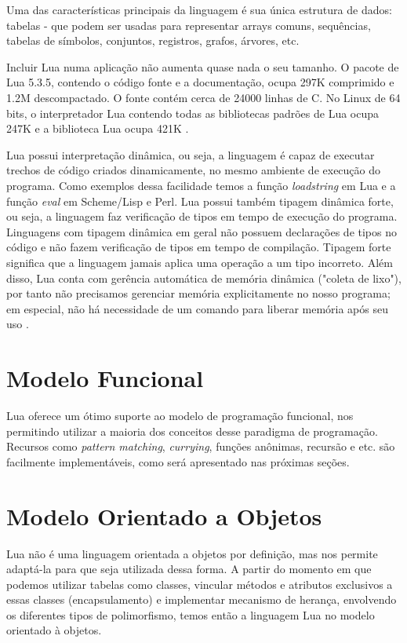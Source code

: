 \documentclass[rel_mlp]{iiufrgs}
\begin{document}
Uma das características principais da linguagem é sua única estrutura de dados: tabelas - que podem ser usadas para representar arrays comuns, sequências, tabelas de símbolos, conjuntos, registros, grafos, árvores, etc.

Incluir Lua numa aplicação não aumenta quase nada o seu tamanho. O pacote de Lua 5.3.5, contendo o código fonte e a documentação, ocupa 297K comprimido e 1.2M descompactado. O fonte contém cerca de 24000 linhas de C. No Linux de 64 bits, o interpretador Lua contendo todas as bibliotecas padrões de Lua ocupa 247K e a biblioteca Lua ocupa 421K \cite{AboutLua}.

Lua possui interpretação dinâmica, ou seja, a linguagem é capaz de executar trechos de código criados dinamicamente, no mesmo ambiente de execução do programa. Como exemplos dessa facilidade temos a função \textit{loadstring} em Lua e a função \textit{eval} em Scheme/Lisp e Perl. Lua possui também tipagem dinâmica forte, ou seja, a linguagem faz verificação de tipos em tempo de execução do programa. Linguagens com
tipagem dinâmica em geral não possuem declarações de tipos no código e não fazem verificação de tipos em tempo de compilação. Tipagem forte significa que a linguagem jamais aplica uma operação a um tipo incorreto. Além disso, Lua conta com gerência automática de memória dinâmica ("coleta de lixo"), por tanto não precisamos gerenciar memória explicitamente no nosso programa; em especial, não há necessidade de um comando para liberar memória após seu uso \cite{IntroLuaPDF}.

\section{Modelo Funcional}

Lua oferece um ótimo suporte ao modelo de programação funcional, nos permitindo utilizar a maioria dos conceitos desse paradigma de programação. Recursos como \textit{pattern matching}, \textit{currying}, funções anônimas, recursão e etc. são facilmente implementáveis, como será apresentado nas próximas seções.

\section{Modelo Orientado a Objetos}

Lua não é uma linguagem orientada a objetos por definição, mas nos permite adaptá-la para que seja utilizada dessa forma. A partir do momento em que podemos utilizar tabelas como classes, vincular métodos e atributos exclusivos a essas classes (encapsulamento) e implementar mecanismo de herança, envolvendo os diferentes tipos de polimorfismo, temos então a linguagem Lua no modelo orientado à objetos.
\end{document}
